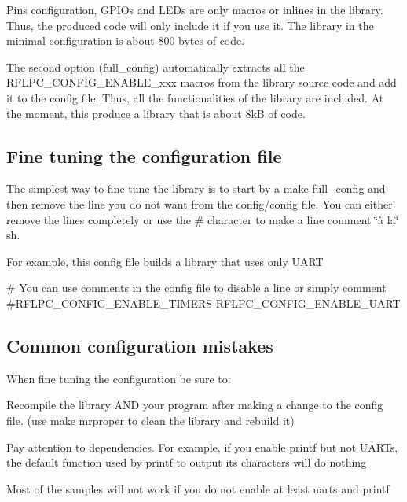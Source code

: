 Pins configuration, G\-P\-I\-Os and L\-E\-Ds are only macros or inlines in the library. Thus, the produced code will only include it if you use it. The library in the minimal configuration is about 800 bytes of code.

The second option (full\-\_\-config) automatically extracts all the {\ttfamily R\-F\-L\-P\-C\-\_\-\-C\-O\-N\-F\-I\-G\-\_\-\-E\-N\-A\-B\-L\-E\-\_\-xxx} macros from the library source code and add it to the config file. Thus, all the functionalities of the library are included. At the moment, this produce a library that is about 8k\-B of code.\hypertarget{start_fine-tune}{}\subsection{Fine tuning the configuration file}\label{start_fine-tune}
The simplest way to fine tune the library is to start by a make full\-\_\-config and then remove the line you do not want from the config/config file. You can either remove the lines completely or use the {\ttfamily \#} character to make a line comment \char`\"{}à la\char`\"{} sh.

For example, this config file builds a library that uses only U\-A\-R\-T


\begin{DoxyCode}
 # You can use comments in the config file to disable a line or simply comment
 #RFLPC_CONFIG_ENABLE_TIMERS
 RFLPC_CONFIG_ENABLE_UART
\end{DoxyCode}
\hypertarget{start_warnings}{}\subsection{Common configuration mistakes}\label{start_warnings}
When fine tuning the configuration be sure to\-:
\begin{DoxyItemize}
\item Recompile the library A\-N\-D your program after making a change to the config file. (use make mrproper to clean the library and rebuild it)
\item Pay attention to dependencies. For example, if you enable printf but not U\-A\-R\-Ts, the default function used by printf to output its characters will do nothing
\item Most of the samples will not work if you do not enable at least uarts and printf 
\end{DoxyItemize}